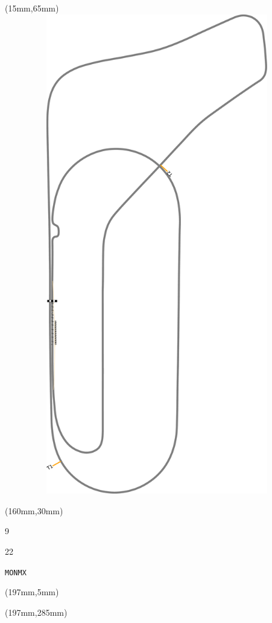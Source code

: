 \begin{textblock*}{185mm}(15mm,65mm)%
\centering
\mbox{\includegraphics[width=185mm,height=210mm,keepaspectratio]{PT/MONMX.pdf}}
\end{textblock*}
\begin{textblock*}{40mm}(160mm,30mm)%
\Large
\par{} 
\par9 
\par22 
\par\hfill\tiny\tt MONMX\\
\end{textblock*}
\begin{textblock*}{20mm}(197mm,5mm)%
\fbox{\thepage}
\label{MONMX}
\end{textblock*}
\begin{textblock*}{20mm}(197mm,285mm)%
\fbox{\thepage}
\end{textblock*}

